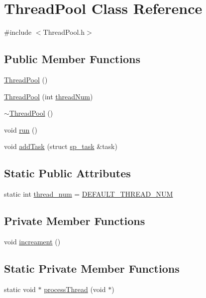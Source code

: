 \hypertarget{class_thread_pool}{\section{Thread\+Pool Class Reference}
\label{class_thread_pool}
}


{\ttfamily \#include $<$Thread\+Pool.\+h$>$}

\subsection*{Public Member Functions}
\begin{DoxyCompactItemize}
\item 
\hyperlink{class_thread_pool_a3225e86aa7835545b3f6c2c8d363d5e5}{Thread\+Pool} ()
\item 
\hyperlink{class_thread_pool_a2a6448ca556df8e8f9ab5242994dfb1e}{Thread\+Pool} (int \hyperlink{class_thread_pool_a080caea6c49348371e9ade20593da05d}{thread\+Num})
\item 
\hyperlink{class_thread_pool_a44d3d2ab618970605e684efc216655eb}{$\sim$\+Thread\+Pool} ()
\item 
void \hyperlink{class_thread_pool_af2281090fafb5b06e4cde7c7c1481525}{run} ()
\item 
void \hyperlink{class_thread_pool_a9e3e877fcf0f4ca4a146db6e139094f3}{add\+Task} (struct \hyperlink{structsp__task}{sp\+\_\+task} \&task)
\end{DoxyCompactItemize}
\subsection*{Static Public Attributes}
\begin{DoxyCompactItemize}
\item 
static int \hyperlink{class_thread_pool_a2bde4887496aa925585e188eb83cd2ee}{thread\+\_\+num} = \hyperlink{configure_8h_a42263ba14c8177f48c9eb58d6d912ad5}{D\+E\+F\+A\+U\+L\+T\+\_\+\+T\+H\+R\+E\+A\+D\+\_\+\+N\+U\+M}
\end{DoxyCompactItemize}
\subsection*{Private Member Functions}
\begin{DoxyCompactItemize}
\item 
void \hyperlink{class_thread_pool_a56b5e60a7b47491c8a74f87625b12695}{increament} ()
\end{DoxyCompactItemize}
\subsection*{Static Private Member Functions}
\begin{DoxyCompactItemize}
\item 
static void $\ast$ \hyperlink{class_thread_pool_a2c631f968dbc6527cdb49a612a528623}{process\+Thread} (void $\ast$)
\end{DoxyCompactItemize}
